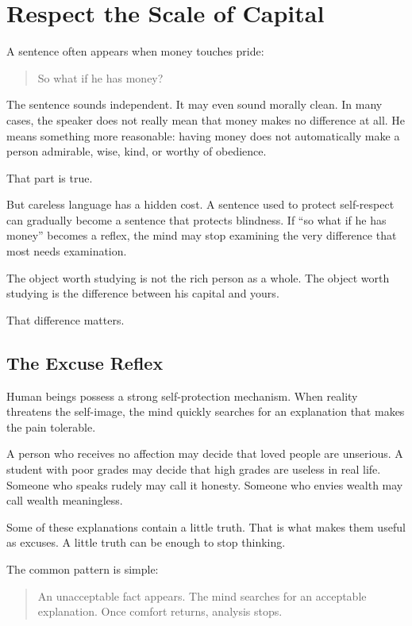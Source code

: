 \chapter{Respect the Scale of Capital}

A sentence often appears when money touches pride:

\begin{quote}
So what if he has money?
\end{quote}

The sentence sounds independent. It may even sound morally clean. In many cases, the speaker does not really mean that money makes no difference at all. He means something more reasonable: having money does not automatically make a person admirable, wise, kind, or worthy of obedience.

That part is true.

But careless language has a hidden cost. A sentence used to protect self-respect can gradually become a sentence that protects blindness. If ``so what if he has money'' becomes a reflex, the mind may stop examining the very difference that most needs examination.

The object worth studying is not the rich person as a whole. The object worth studying is the difference between his capital and yours.

That difference matters.

\section*{The Excuse Reflex}

Human beings possess a strong self-protection mechanism. When reality threatens the self-image, the mind quickly searches for an explanation that makes the pain tolerable.

A person who receives no affection may decide that loved people are unserious. A student with poor grades may decide that high grades are useless in real life. Someone who speaks rudely may call it honesty. Someone who envies wealth may call wealth meaningless.

Some of these explanations contain a little truth. That is what makes them useful as excuses. A little truth can be enough to stop thinking.

The common pattern is simple:

\begin{quote}
An unacceptable fact appears. The mind searches for an acceptable explanation. Once comfort returns, analysis stops.
\end{quote}

